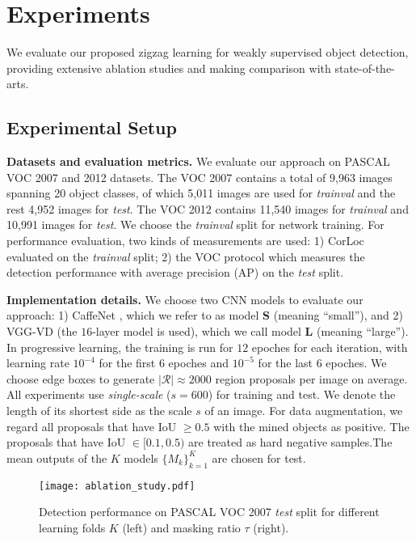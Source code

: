 \documentclass[10pt,twocolumn,letterpaper]{article}
\begin{document}
\section{Experiments}
We evaluate our proposed zigzag learning for weakly supervised object detection, providing extensive ablation studies and making comparison with state-of-the-arts.
\subsection{Experimental Setup}
\noindent \textbf{Datasets and evaluation metrics.} We evaluate our approach on PASCAL VOC 2007 \cite{everingham2010pascal} and 2012 \cite{everingham2015pascal} datasets. The VOC 2007 contains a total of 9,963 images spanning 20 object classes, of which 5,011 images are used for \emph{trainval} and the rest 4,952 images for \emph{test}. The VOC 2012 contains 11,540 images for \emph{trainval} and 10,991 images for \emph{test}. We choose the \emph{trainval} split for network training. For performance evaluation, two kinds of measurements are used: 1) CorLoc \cite{deselaers2012weakly} evaluated on the \emph{trainval} split; 2) the VOC protocol which measures the detection performance with average precision (AP) on the \emph{test} split.


\noindent \textbf{Implementation details.}
We choose two CNN models to evaluate our approach: 1) CaffeNet \cite{jia2014caffe}, which we refer to as model \textbf{S} (meaning ``small''), and 2) VGG-VD \cite{Simonyan14c} (the $16$-layer model is used), which we call model \textbf{L} (meaning ``large''). In progressive learning, the training is run for $12$ epoches for each iteration, with learning rate $10^{-4}$ for the first $6$ epoches and  $10^{-5}$ for the last $6$ epoches. We choose edge boxes \cite{zitnick2014edge} to generate $|\mathcal{R}|\!\approx\!2000$ region proposals per image on average. All experiments use \emph{single-scale} ($s\!=\!600$) for training and test. We denote the length of its shortest side as the scale $s$ of an image. For data augmentation, we regard all proposals that have IoU $\geq 0.5$ with the mined objects as positive. The proposals that have IoU $\in [0.1,0.5)$ are treated as hard negative samples.The mean outputs of the $K$ models $\{M_k\}_{k=1}^K$ are chosen for test.

\begin{figure}[t]
  \centering
\texttt{[image: ablation\_study.pdf]} \\
   \vspace{0.1cm}
  \caption{Detection performance on PASCAL VOC 2007 \emph{test} split for different learning folds $K$ (left) and masking ratio $\tau$ (right).} \label{ablation}
  \vspace{-0.1cm}
\end{figure}
\end{document}
